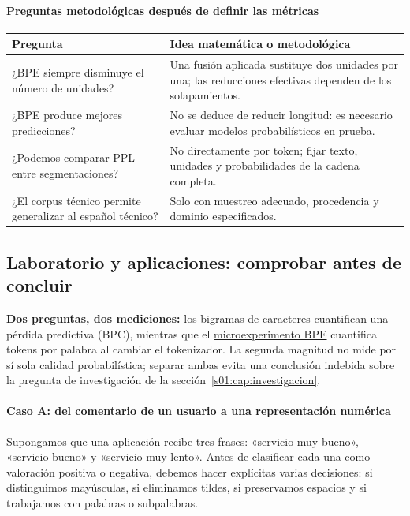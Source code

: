 \paragraph{Preguntas metodológicas después de definir las métricas}
\begin{center}
\begin{tabularx}{\textwidth}{p{55mm}X}\toprule
Pregunta & Idea matemática o metodológica\\\midrule
¿BPE siempre disminuye el número de unidades? & Una fusión aplicada sustituye dos unidades por una; las reducciones efectivas dependen de los solapamientos.\\
¿BPE produce mejores predicciones? & No se deduce de reducir longitud: es necesario evaluar modelos probabilísticos en prueba.\\
¿Podemos comparar PPL entre segmentaciones? & No directamente por token; fijar texto, unidades y probabilidades de la cadena completa.\\
¿El corpus técnico permite generalizar al español técnico? & Solo con muestreo adecuado, procedencia y dominio especificados.\\\bottomrule
\end{tabularx}
\end{center}

\subsection{Laboratorio y aplicaciones: comprobar antes de concluir}\label{s01:cap:laboratorios}\label{s01:lab:mat}
\noindent\textbf{Dos preguntas, dos mediciones:} los bigramas de caracteres
cuantifican una pérdida predictiva (BPC), mientras que el
\hyperref[s01:lab:ic10]{microexperimento BPE} cuantifica tokens por palabra
al cambiar el tokenizador. La segunda magnitud no mide por sí sola calidad
probabilística; separar ambas evita una conclusión indebida sobre la pregunta de
investigación de la sección~\ref{s01:cap:investigacion}.

\paragraph{Caso A: del comentario de un usuario a una representación numérica}
Supongamos que una aplicación recibe tres frases: «servicio muy bueno», «servicio bueno» y «servicio muy lento». Antes de clasificar cada una como valoración positiva o negativa, debemos hacer explícitas varias decisiones: si distinguimos mayúsculas, si eliminamos tildes, si preservamos espacios y si trabajamos con palabras o subpalabras.

